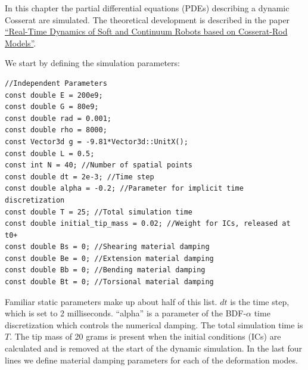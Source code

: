 \documentclass[12pt]{article}
\begin{document}
\makeatletter
\renewcommand{\@maketitle}{
\newpage
\null
\vskip 2em
\begin{center}
{\LARGE \@title \par}
\end{center}
\par
} \makeatother

\maketitle

In this chapter the partial differential equations (PDEs) describing a dynamic Cosserat are simulated. The theoretical development is described in the paper \href{https://journals.sagepub.com/doi/10.1177/0278364919842269}{``Real-Time Dynamics of Soft and Continuum Robots based on Cosserat-Rod Models''}.

We start by defining the simulation parameters:
\begin{lstlisting}
//Independent Parameters
const double E = 200e9;
const double G = 80e9;
const double rad = 0.001;
const double rho = 8000;
const Vector3d g = -9.81*Vector3d::UnitX();
const double L = 0.5;
const int N = 40; //Number of spatial points
const double dt = 2e-3; //Time step
const double alpha = -0.2; //Parameter for implicit time discretization
const double T = 25; //Total simulation time
const double initial_tip_mass = 0.02; //Weight for ICs, released at t0+
const double Bs = 0; //Shearing material damping
const double Be = 0; //Extension material damping
const double Bb = 0; //Bending material damping
const double Bt = 0; //Torsional material damping
\end{lstlisting}
Familiar static parameters make up about half of this list. $dt$ is the time step, which is set to 2 milliseconds. ``alpha'' is a parameter of the BDF-$\alpha$ time discretization which controls the numerical damping. The total simulation time is $T$. The tip mass of 20 grams is present when the initial conditions (ICs) are calculated and is removed at the start of the dynamic simulation. In the last four lines we define material damping parameters for each of the deformation modes.
\end{document}
